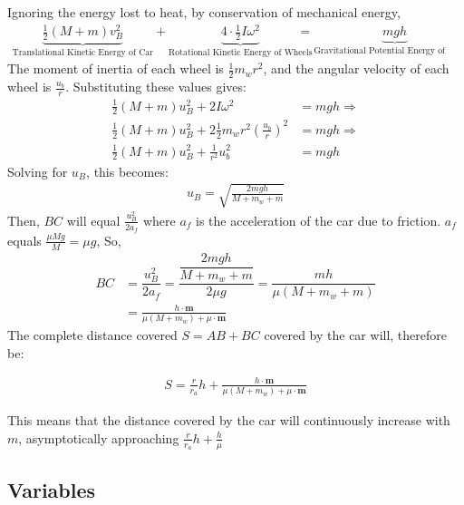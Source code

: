 \documentclass[titlepage,12pt]{article}
\let\oldsubsection\subsection
\renewcommand\subsection{\FloatBarrier \oldsubsection}
\begin{document}
Ignoring the energy lost to heat, by conservation of mechanical energy,
%
\begin{align*}
    \underbrace{\frac{1}{2}(M+m)v_B^2}_{\text{Translational Kinetic Energy of Car}} +
    \underbrace{4\cdot\frac{1}{2}I\omega^2}_{\text{Rotational Kinetic Energy of Wheels}} &=
    \underbrace{mgh}_{\text{Gravitational Potential Energy of Weight}}
\end{align*}
%
The moment of inertia of each wheel is $\frac{1}{2}m_wr^2$, and the angular velocity of each
wheel is $\frac{u_b}{r}$. Substituting these values gives:
%
\begin{align*}
    \frac{1}{2}(M+m)u_B^2 + 2I\omega^2                          &= mgh \Rightarrow \\
    \frac{1}{2}(M+m)u_B^2 + 2\frac{1}{2}m_wr^2(\frac{u_b}{r})^2 &= mgh \Rightarrow \\
    \frac{1}{2}(M+m)u_B^2 + \frac{1}{r^2}u_b^2 &= mgh
\end{align*}
%
Solving for $u_B$, this becomes:
%
\begin{align*}
    u_B = \sqrt{\frac{2mgh}{M+m_w+m}}
\end{align*}
%
Then, $BC$ will equal $\frac{u_B^2}{2a_f}$ where $a_f$ is the acceleration of the car due to
friction. $a_f$ equals $\frac{\mu M g}{M} = \mu g$, So, 
%
\begin{align*}
    BC &= \dfrac{u_B^2}{2a_f} = \dfrac{\dfrac{2mgh}{M+m_w+m}}{2\mu g}
                             = \dfrac{mh}{\mu(M+m_w+m)} \\
       &= \frac{h\cdot \mathbf{m}}{\mu(M+m_w) + \mu \cdot \textbf{m}}
\end{align*}
%
The complete distance covered $S=AB+BC$ covered by the car will, therefore be: 
%
\begin{framed}
    \begin{equation} \label{eq:s_formula}
    \begin{aligned}
        S = \frac{r}{r_a}h + \frac{h\cdot \mathbf{m}}{\mu(M+m_w) + \mu \cdot \textbf{m}}
    \end{aligned}
    \end{equation}
\end{framed}
%
This means that the distance covered by the car will continuously increase with $m$,
asymptotically approaching $\frac{r}{r_a}h + \frac{h}{\mu}$

\subsection{Variables}
\end{document}
